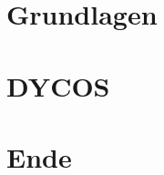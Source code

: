 \documentclass[hyperref={pdfpagelabels=false},usepdftitle=false]{beamer}
\begin{document}
\title{\titleText}
\subtitle{}
\author{\tutor}
\date{28. November 2013}
\subject{Proseminar Informatik}

\frame{\titlepage}


\section{Grundlagen}


\section{DYCOS}


\section{Ende}

\end{document}
